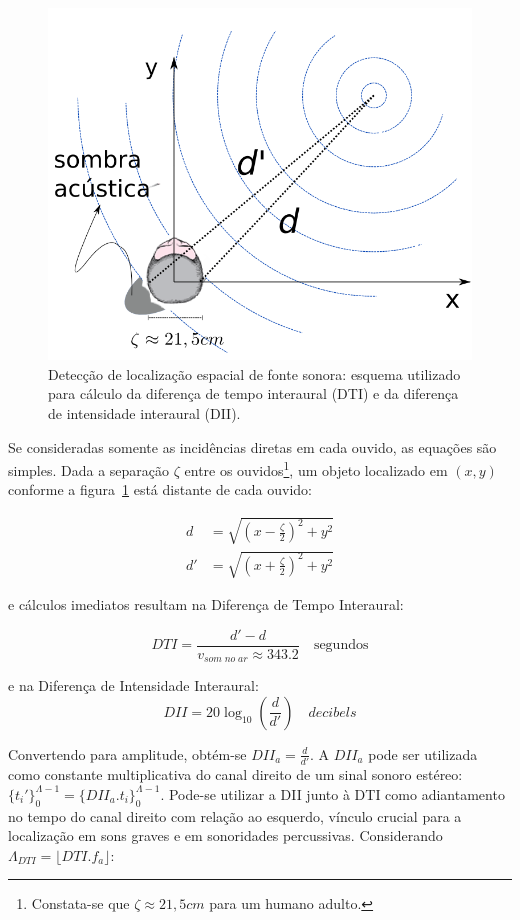 \begin{figure}[h!]
    \centering
        \includegraphics[width=.5\textwidth]{figuras/espacializacao___}
    \caption{Detecção de localização espacial de fonte sonora: esquema utilizado para cálculo da diferença de tempo interaural (DTI) e da diferença de intensidade interaural (DII).}
        \label{fig:spac}
\end{figure}



	Se consideradas somente as incidências diretas em cada ouvido, as equações são simples. Dada a separação $\zeta$ entre os ouvidos\footnote{Constata-se que $\zeta \approx 21,5cm$ para um humano adulto.},
um objeto localizado em $(x,y)$ conforme a figura~\ref{fig:spac}
está distante de cada ouvido:

\begin{equation}\label{eq:distOuvidos}
\begin{split}
d & =\sqrt{\left (x-\frac{\zeta}{2} \right )^2+y^2} \\
d' & =\sqrt{\left (x+\frac{\zeta}{2} \right )^2 + y^2}
\end{split}
\end{equation}


e cálculos imediatos resultam na Diferença de Tempo Interaural:

\begin{equation}\label{eq:dti}
DTI=\frac{d'-d}{v_{som\;no\;ar}\approx 343.2 }\quad \text{segundos}
\end{equation}

e na Diferença de Intensidade Interaural:
\begin{equation}\label{eq:dii}
DII=20\log_{10}\left (\frac{d}{d'}\right) \quad decibels
\end{equation}

Convertendo para amplitude, obtém-se $DII_a=\frac{d}{d'}$. A $DII_a$ pode
ser utilizada como constante multiplicativa do canal direito de um sinal sonoro estéreo: $\{t_i'\}_0^{\Lambda -1}=\{DII_a . t_i\}_0^{\Lambda -1}$. Pode-se utilizar a DII junto à DTI como adiantamento no tempo do canal direito com relação ao esquerdo, vínculo crucial para a localização em sons graves e em sonoridades percussivas.\cite{Heeger}  
Considerando $\Lambda_{DTI}=\lfloor DTI . f_a \rfloor$:

